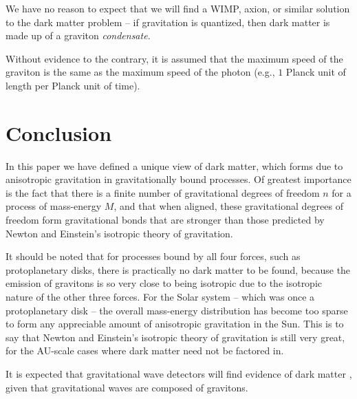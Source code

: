 \documentclass[12pt]{article}
\begin{document}
We have no reason to expect that we will find a WIMP, axion, or similar solution \cite{berger, aalbers, quiskamp, haipeng, hui, ackerman} to the dark matter problem -- if gravitation is quantized, then dark matter is made up of a graviton {\textit{condensate}}.

Without evidence to the contrary, it is assumed that the maximum speed of the graviton is the same as the maximum speed of the photon (e.g., $1$ Planck unit of length per Planck unit of time).






\section{Conclusion}

In this paper we have defined a unique view of dark matter, which forms due to anisotropic gravitation in gravitationally bound processes.
Of greatest importance is the fact that there is a finite number of gravitational degrees of freedom $n$ for a process of mass-energy $M$, and that when aligned, these gravitational degrees of freedom form gravitational bonds that are stronger than those predicted by Newton and Einstein's isotropic theory of gravitation.

It should be noted that for processes bound by all four forces, such as protoplanetary disks, there is practically no dark matter to be found, because the emission of gravitons is so very close to being isotropic due to the isotropic nature of the other three forces.
For the Solar system -- which was once a protoplanetary disk -- the overall mass-energy distribution has become too sparse to form any appreciable amount of anisotropic gravitation in the Sun.
This is to say that Newton and Einstein's isotropic theory of gravitation is still very great, for the AU-scale cases where dark matter need not be factored in.

It is expected that gravitational wave detectors will find evidence of dark matter \cite{LIGO}, given that gravitational waves are composed of gravitons.







\pagebreak
\end{document}
